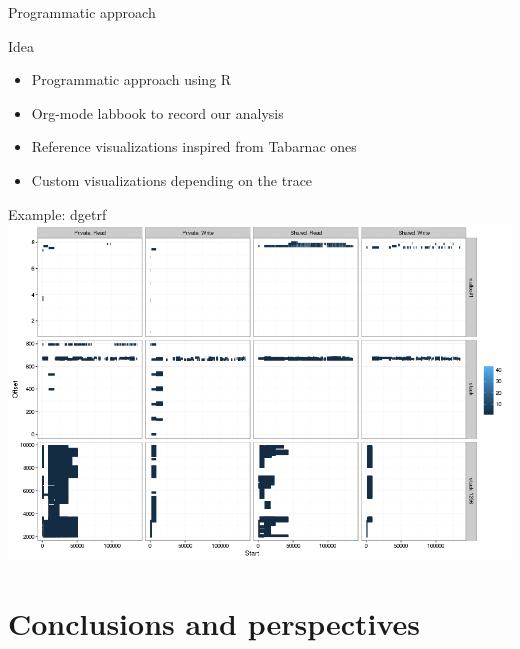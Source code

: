 \documentclass[xcolor={usenames,dvipsnames},hyperref={pdfusetitle}]{beamer}
\begin{document}
\begin{frame}{Programmatic approach}
    \begin{block}{Idea}
        \begin{itemize}
            \item Programmatic approach using R
            \item Org-mode labbook to record our analysis
            \item Reference visualizations inspired from Tabarnac ones
            \item Custom visualizations depending on the trace
        \end{itemize}
    \end{block}
\end{frame}

\begin{frame}{Example: dgetrf}
    \centering
    \includegraphics[width=\linewidth]{labbook-slides/intensity_RW_dgetrf_zoom}
\end{frame}

\section{Conclusions and perspectives}
\end{document}
